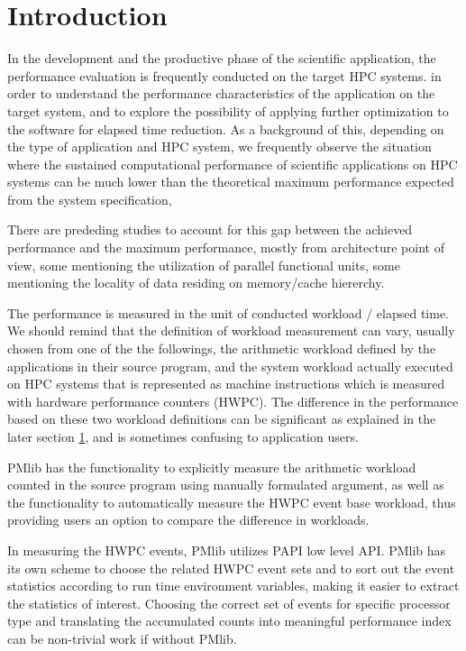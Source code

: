 \documentclass[conference]{IEEEtran}
\begin{document}
\section{Introduction}

In the development and the productive phase of the scientific application,
the performance evaluation is frequently conducted on the target HPC systems.
in order to understand the performance characteristics
of the application on the target system, and to explore the possibility of
applying further optimization to the software for elapsed time reduction.
As a background of this,
depending on the type of application and HPC system,
we frequently observe the situation where
the sustained computational performance of scientific applications on HPC
systems can be much lower than the theoretical maximum performance
expected from the system specification,

There are prededing studies to account for this gap between the achieved
performance and the maximum performance, mostly from architecture
point of view,
some mentioning the utilization of parallel functional units,
some mentioning the locality of data residing on memory/cache hiererchy.

The performance is measured in the unit of conducted workload / elapsed time.
We should remind that the definition of workload measurement can vary,
usually chosen from one of the the followings,
the arithmetic workload defined by the applications in their source program,
and the system workload actually executed on HPC systems that is represented as
machine instructions which is measured with hardware performance counters (HWPC).
The difference in the performance based on these two workload definitions
can be significant as explained in the later section \ref{},
and is sometimes confusing to application users.


PMlib has the functionality
to explicitly measure the arithmetic workload counted in the source program
using manually formulated argument, as well as the functionality
to automatically measure the HWPC event base workload,
thus providing users an option to compare the difference in workloads.

In measuring the HWPC events, PMlib utilizes PAPI \cite{} low level API.
PMlib has its own scheme to choose the related HWPC event sets and to sort out
the event statistics according to run time environment variables, making it
easier to extract the statistics of interest.
Choosing the correct set of events for specific processor type and
translating the accumulated counts into meaningful performance index can be
non-trivial work if without PMlib.
\end{document}
